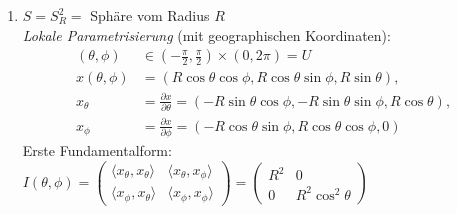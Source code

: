 \begin{example}
\begin{enumerate}
    \item $ S = S_R^2 = $ Sphäre vom Radius $ R $ \\
    \emph{Lokale Parametrisierung} (mit geographischen Koordinaten):
    \begin{align*}
      (\theta, \phi) &\in (-\frac{\pi}{2}, \frac{\pi}{2}) \times (0, 2\pi) = U \\
      x(\theta, \phi) &= \left( R\cos \theta \cos \phi, R \cos \theta \sin \phi, R \sin \theta \right)\text{,} \\
      x_\theta &= \frac{\partial x}{\partial \theta} = \left( - R \sin \theta \cos \phi, -R \sin \theta \sin \phi, R \cos \theta \right)\text{,} \\
      x_\phi &= \frac{\partial x}{\partial \phi} = \left( - R \cos \theta \sin \phi, R \cos \theta \cos \phi, 0 \right)
    \end{align*}
    Erste Fundamentalform: $ I(\theta, \phi) = \begin{pmatrix}
      \langle x_\theta, x_\theta \rangle & \langle x_\theta, x_\phi \rangle \\
      \langle x_\phi, x_\theta \rangle & \langle x_\phi, x_\phi \rangle
    \end{pmatrix} = \begin{pmatrix}
        R^2 & 0 \\
        0 & R^2\cos^2 \theta
      \end{pmatrix} $
  \end{enumerate}
\end{example}


